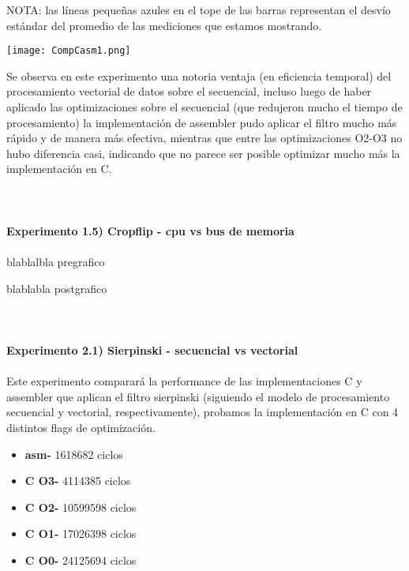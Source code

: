 \documentclass[a4paper]{article}
\begin{document}
NOTA: las l\'{i}neas peque\~nas azules en el tope de las barras representan el desv\'{i}o est\'{a}ndar del promedio de las mediciones que estamos mostrando.

\texttt{[image: CompCasm1.png]}

Se observa en este experimento una notoria ventaja (en eficiencia temporal) del procesamiento vectorial de datos sobre el secuencial, incluso luego de haber aplicado las optimizaciones sobre el secuencial (que redujeron mucho el tiempo de procesamiento) la implementaci\'{o}n de assembler pudo aplicar el filtro mucho m\'{a}s r\'{a}pido y de manera m\'{a}s efectiva, mientras que entre las optimizaciones O2-O3 no hubo diferencia casi, indicando que no parece ser posible optimizar mucho m\'{a}s la implementaci\'{o}n en C.\\ \\ \\ \\


\textbf{Experimento 1.5) Cropflip - cpu vs bus de memoria}\\ \\

blablalbla pregrafico

blablabla postgrafico \\ \\ \\ \\

\textbf{Experimento 2.1) Sierpinski - secuencial vs vectorial}\\ \\

Este experimento comparar\'{a} la performance de las implementaciones C y assembler que aplican el filtro sierpinski (siguiendo el modelo de procesamiento secuencial y vectorial, respectivamente), probamos la implementaci\'{o}n en C con 4 distintos flags de optimizaci\'{o}n.

\begin{itemize}


\item \textbf{asm-} 1618682 ciclos\\
\item \textbf{C O3-} 4114385  ciclos\\
\item \textbf{C O2-} 10599598 ciclos\\
\item \textbf{C O1-} 17026398 ciclos\\
\item \textbf{C O0-} 24125694 ciclos\\ \\ \\

\end{itemize}
\end{document}
